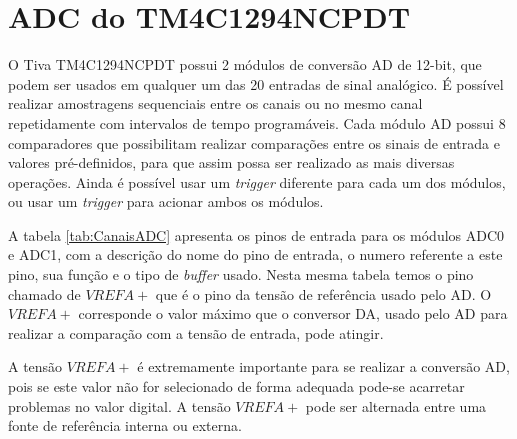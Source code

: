 \section{ADC do TM4C1294NCPDT}

O Tiva TM4C1294NCPDT possui 2 módulos de conversão AD  de 12-bit, que podem ser usados em qualquer um das 20 entradas de sinal analógico. É possível realizar amostragens sequenciais entre os canais ou no mesmo canal repetidamente com intervalos de tempo  programáveis. Cada módulo AD possui 8 comparadores que possibilitam realizar comparações entre os sinais de entrada e  valores pré-definidos, para que assim possa ser realizado as mais diversas operações.  Ainda é possível usar um \emph{trigger} diferente para cada um dos módulos, ou usar um \emph{trigger} para acionar ambos os módulos.

A tabela \ref{tab:CanaisADC} apresenta os pinos de entrada para os módulos ADC0 e ADC1, com a descrição do nome do pino de entrada, o numero referente a este pino, sua função e o tipo de \emph{buffer} usado. Nesta mesma tabela temos o  pino chamado de $VREFA+$ que é o pino da tensão de referência usado pelo AD. O $VREFA+$ corresponde o valor máximo que o conversor DA, usado pelo AD para realizar a comparação com a tensão de entrada, pode atingir. 

A tensão $VREFA+$ é extremamente importante para se realizar a conversão AD, pois se este valor não for selecionado de forma adequada pode-se acarretar problemas no valor digital. A tensão $VREFA+$ pode ser alternada entre uma fonte de referência interna ou externa. 

